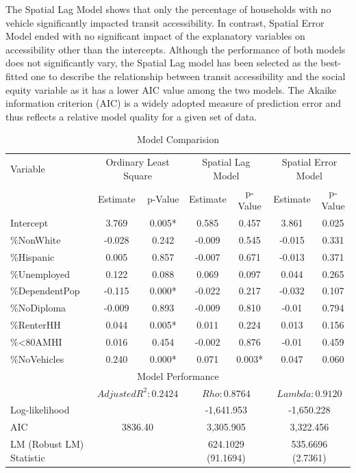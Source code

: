 \documentclass[numbered]{trbunofficial}
\begin{document}
The Spatial Lag Model shows that only the percentage of households with no vehicle significantly impacted transit accessibility. In contrast, Spatial Error Model ended with no significant impact of the explanatory variables on accessibility other than the intercepts. Although the performance of both models does not significantly vary, the Spatial Lag model has been selected as the best-fitted one to describe the relationship between transit accessibility and the social equity variable as it has a lower AIC value among the two models. The Akaike information criterion (AIC) is a widely adopted measure of prediction error \cite{Aho2014} and thus reflects a relative model quality for a given set of data.

\begin{table}[!ht]
	\caption{Model Comparision}\label{tab:versions}
	\begin{center}
		\begin{tabular}{l|c c|c c|c c}
                \hline
                Variable & \multicolumn{2}{c}{Ordinary Least Square} & \multicolumn{2}{c}{Spatial Lag Model} & \multicolumn{2}{c}{Spatial Error Model}\\
			    & Estimate & p-Value & Estimate & p-Value & Estimate & p-Value\\\hline
                Intercept & 3.769 & 0.005* & 0.585 & 0.457 & 3.861 & 0.025\\
                \%NonWhite & -0.028 & 0.242 & -0.009 & 0.545 & -0.015 & 0.331\\
                \%Hispanic & 0.005 & 0.857 & -0.007 & 0.671 & -0.013 & 0.371\\
                \%Unemployed & 0.122 & 0.088 & 0.069 & 0.097 & 0.044 & 0.265\\
                \%DependentPop & -0.115 & 0.000* & -0.022 & 0.217 & -0.032 & 0.107\\
                \%NoDiploma & -0.009 & 0.893 & -0.009 & 0.810 & -0.01 & 0.794\\
                \%RenterHH & 0.044 & 0.005* & 0.011 & 0.224 & 0.013 & 0.156\\
                \%<80AMHI & 0.016 & 0.454 & -0.002 & 0.876 & -0.01 & 0.459\\
                \%NoVehicles & 0.240 & 0.000* & 0.071 & 0.003* & 0.047 & 0.060\\\hline
                \multicolumn{7}{c}{Model Performance}\\\hline
                & \multicolumn{2}{c}{$Adjusted R^2: 0.2424$} & \multicolumn{2}{c}{$Rho: 0.8764$} & \multicolumn{2}{c}{$Lambda: 0.9120$}\\
                Log-likelihood & \multicolumn{2}{c}{} & \multicolumn{2}{c}{-1,641.953} & \multicolumn{2}{c}{-1,650.228}\\
                AIC & \multicolumn{2}{c}{3836.40} & \multicolumn{2}{c}{3,305.905} & \multicolumn{2}{c}{3,322.456}\\
                LM (Robust LM) Statistic & \multicolumn{2}{c}{} & \multicolumn{2}{c}{624.1029 (91.1694)} & \multicolumn{2}{c}{535.6696 (2.7361)}\\\hline
		\end{tabular}
	\end{center}
\end{table}
\end{document}
